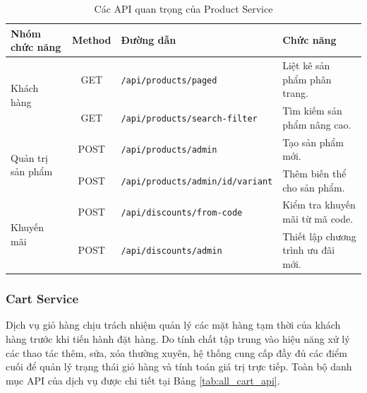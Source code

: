 \begin{table}[H]
\centering
\caption{Các API quan trọng của Product Service}
\label{tab:core_product_api}
\begin{tabular}{|l|c|l|l|}
\hline
\textbf{Nhóm chức năng} & \textbf{Method} & \textbf{Đường dẫn} & \textbf{Chức năng} \\ \hline
\multirow{2}{*}{Khách hàng} & GET & \texttt{/api/products/paged} & Liệt kê sản phẩm phân trang. \\ \cline{2-4}
& GET & \texttt{/api/products/search-filter} & Tìm kiếm sản phẩm nâng cao. \\ \hline
\multirow{2}{*}{Quản trị sản phẩm} & POST & \texttt{/api/products/admin} & Tạo sản phẩm mới. \\ \cline{2-4}
& POST & \texttt{/api/products/admin/{id}/variant} & Thêm biến thể cho sản phẩm. \\ \hline
\multirow{2}{*}{Khuyến mãi} & POST & \texttt{/api/discounts/from-code} & Kiểm tra khuyến mãi từ mã code. \\ \cline{2-4}
& POST & \texttt{/api/discounts/admin} & Thiết lập chương trình ưu đãi mới. \\ \hline
\end{tabular}
\end{table}

\subsubsection{Cart Service}

Dịch vụ giỏ hàng chịu trách nhiệm quản lý các mặt hàng tạm thời của khách hàng trước khi tiến hành đặt hàng. Do tính chất tập trung vào hiệu năng xử lý các thao tác thêm, sửa, xóa thường xuyên, hệ thống cung cấp đầy đủ các điểm cuối để quản lý trạng thái giỏ hàng và tính toán giá trị trực tiếp. Toàn bộ danh mục API của dịch vụ được chi tiết tại Bảng \ref{tab:all_cart_api}.

